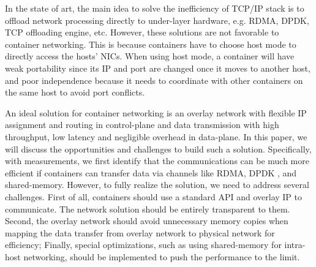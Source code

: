 In the state of art, the main idea to solve the inefficiency of TCP/IP stack 
is to offload network processing directly to under-layer hardware, e.g. RDMA, 
DPDK, TCP offloading engine, etc. However, these solutions are not favorable to container networking. This is because containers have to choose host mode to directly access the hosts' NICs. When using host mode, a container
will have weak portability since its IP and port are changed once it moves
to another host, and poor independence because it needs to coordinate with
other containers on the same host to avoid port conflicts.

An ideal solution for container networking is an overlay network with flexible
IP assignment and routing in control-plane and data transmission with high 
throughput, low latency and negligible overhead in data-plane. In this paper, we 
will discuss the opportunities and challenges to build such a solution. 
Specifically, with measurements, we first identify that the communications 
can be much more efficient if containers can transfer data via channels like
RDMA, DPDK , and shared-memory. However, to fully
realize the solution, we need to address several challenges. First of all, 
containers should use a standard API and overlay IP to communicate. The network
solution should be entirely transparent to them. Second, the overlay network
should avoid unnecessary memory copies when mapping the data transfer from
overlay network to physical network for efficiency; Finally, special optimizations, such as using shared-memory for intra-host networking, should be
implemented to push the performance to the limit.
